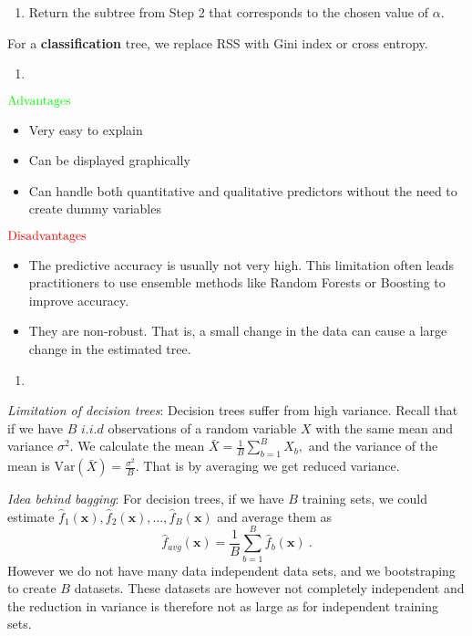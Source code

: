 \documentclass[
]{article}
\providecommand{\tightlist}{%
  \setlength{\itemsep}{0pt}\setlength{\parskip}{0pt}}
\begin{document}
\begin{enumerate}
\def\labelenumi{\arabic{enumi}.}
\setcounter{enumi}{3}
\tightlist
\item
  Return the subtree from Step 2 that corresponds to the chosen value of
  \(\alpha.\)
\end{enumerate}

For a \textbf{classification} tree, we replace RSS with Gini index or
cross entropy.

\begin{enumerate}
\def\labelenumi{\alph{enumi})}
\setcounter{enumi}{1}
\tightlist
\item
\end{enumerate}

\(\color{green}{\text{Advantages}}\)

\begin{itemize}
\item
  Very easy to explain
\item
  Can be displayed graphically
\item
  Can handle both quantitative and qualitative predictors without the
  need to create dummy variables
\end{itemize}

\(\color{red}{\text{Disadvantages}}\)

\begin{itemize}
\item
  The predictive accuracy is usually not very high. This limitation
  often leads practitioners to use ensemble methods like Random Forests
  or Boosting to improve accuracy.
\item
  They are non-robust. That is, a small change in the data can cause a
  large change in the estimated tree.
\end{itemize}

\begin{enumerate}
\def\labelenumi{\alph{enumi})}
\setcounter{enumi}{2}
\tightlist
\item
\end{enumerate}

\emph{Limitation of decision trees}: Decision trees suffer from high
variance. Recall that if we have \(B\) \(i.i.d\) observations of a
random variable \(X\) with the same mean and variance \(\sigma^2.\) We
calculate the mean \(\bar{X} = \frac{1}{B} \sum_{b=1}^B X_b,\) and the
variance of the mean is \(\text{Var}(\bar{X}) = \frac{\sigma^2}{B}.\)
That is by averaging we get reduced variance.

\emph{Idea behind bagging}: For decision trees, if we have \(B\)
training sets, we could estimate
\(\hat{f}_1({\boldsymbol x}),\hat{f}_2({\boldsymbol x}),\ldots, \hat{f}_B({\boldsymbol x})\)
and average them as
\[\hat{f}_{avg}({\boldsymbol x})=\frac{1}{B}\sum_{b=1}^B \hat{f}_b({\boldsymbol x}) \ .\]
However we do not have many data independent data sets, and we
bootstraping to create \(B\) datasets. These datasets are however not
completely independent and the reduction in variance is therefore not as
large as for independent training sets.
\end{document}
